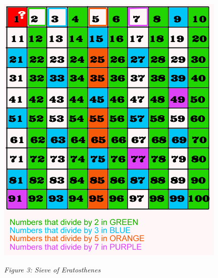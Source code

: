 \documentclass{article}
\begin{document}
\begin{center}
	\includegraphics[width=0.5\columnwidth]{Sieve} %
	
	\textit{Figure 3: Sieve of Eratosthenes}
\end{center}
\end{document}
